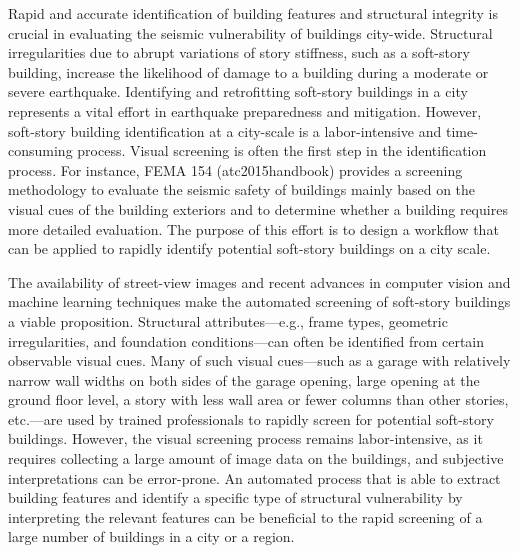 Rapid and accurate identification of building features and structural integrity is crucial in evaluating the seismic vulnerability of buildings city-wide. Structural irregularities due to abrupt variations of story stiffness, such as a soft-story building, increase the likelihood of damage to a building during a moderate or severe earthquake. Identifying and retrofitting soft-story buildings in a city represents a vital effort in earthquake preparedness and mitigation. However, soft-story building identification at a city-scale is a labor-intensive and time-consuming process. Visual screening is often the first step in the identification process. For instance, FEMA 154 (atc2015handbook) provides a screening methodology to evaluate the seismic safety of buildings mainly based on the visual cues of the building exteriors and to determine whether a building requires more detailed evaluation. The purpose of this effort is to design a workflow that can be applied to rapidly identify potential soft-story buildings on a city scale. 

The availability of street-view images and recent advances in computer vision and machine learning techniques make the automated screening of soft-story buildings a viable proposition. Structural attributes—e.g., frame types, geometric irregularities, and foundation conditions—can often be identified from certain observable visual cues. Many of such visual cues—such as a garage with relatively narrow wall widths on both sides of the garage opening, large opening at the ground floor level, a story with less wall area or fewer columns than other stories, etc.—are used by trained professionals to rapidly screen for potential soft-story buildings. However, the visual screening process remains labor-intensive, as it requires collecting a large amount of image data on the buildings, and subjective interpretations can be error-prone. An automated process that is able to extract building features and identify a specific type of structural vulnerability by interpreting the relevant features can be beneficial to the rapid screening of a large number of buildings in a city or a region. 

